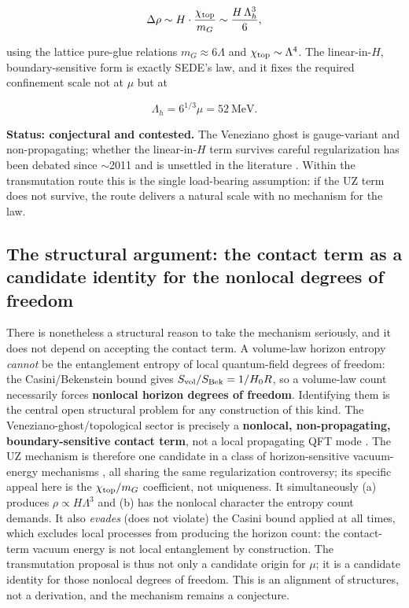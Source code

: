 \documentclass[preprint,12pt]{elsarticle}
\begin{document}
\begin{equation}\Delta\rho \sim H \cdot \frac{\chi_{\rm top}}{m_{G}} \sim \frac{H\,\Lambda_h^3}{6},\end{equation}

using the lattice pure-glue relations \(m_G \approx 6\Lambda\) and
\(\chi_{\rm top} \sim \Lambda^4\). The linear-in-\(H\),
boundary-sensitive form is exactly SEDE's law, and it fixes the required
confinement scale not at \(\mu\) but at

\begin{equation}\Lambda_h = 6^{1/3}\mu = 52\ \text{MeV}.\end{equation}

\textbf{Status: conjectural and contested.} The Veneziano ghost is
gauge-variant and non-propagating; whether the linear-in-\(H\) term
survives careful regularization has been debated since \(\sim\)2011 and
is unsettled in the literature
\citep{Garcia-Salcedo:2013htj, Ebrahimi:2011js, Dudal:2015khv}. Within
the transmutation route this is the single load-bearing assumption: if
the UZ term does not survive, the route delivers a natural scale with no
mechanism for the law.

\subsection{The structural argument: the contact term as a candidate
identity for the nonlocal degrees of freedom}\label{sec-4-2}

There is nonetheless a structural reason to take the mechanism
seriously, and it does not depend on accepting the contact term. A
volume-law horizon entropy \emph{cannot} be the entanglement entropy of
local quantum-field degrees of freedom: the Casini/Bekenstein bound
gives \(S_{\rm vol}/S_{\rm Bek} = 1/H_0 R\), so a volume-law count
necessarily forces \textbf{nonlocal horizon degrees of freedom}.
Identifying them is the central open structural problem for any
construction of this kind. The Veneziano-ghost/topological sector is
precisely a \textbf{nonlocal, non-propagating, boundary-sensitive
contact term}, not a local propagating QFT mode
\citep{Zhitnitsky:2011tr, Zhitnitsky:2011aa, Thomas:2011ee}. The UZ
mechanism is therefore one candidate in a class of horizon-sensitive
vacuum-energy mechanisms
\citep{Urban:2009vy, Urban:2009yg, Ohta:2010in, Cai:2010uf, Klinkhamer:2009ri, Volovik:2008qub},
all sharing the same regularization controversy; its specific appeal
here is the \(\chi_{\rm top}/m_G\) coefficient, not uniqueness. It
simultaneously (a) produces \(\rho \propto H\Lambda^3\) and (b) has the
nonlocal character the entropy count demands. It also \emph{evades}
(does not violate) the Casini bound applied at all times, which excludes
local processes from producing the horizon count: the contact-term
vacuum energy is not local entanglement by construction. The
transmutation proposal is thus not only a candidate origin for \(\mu\);
it is a candidate identity for those nonlocal degrees of freedom. This
is an alignment of structures, not a derivation, and the mechanism
remains a conjecture.
\end{document}

